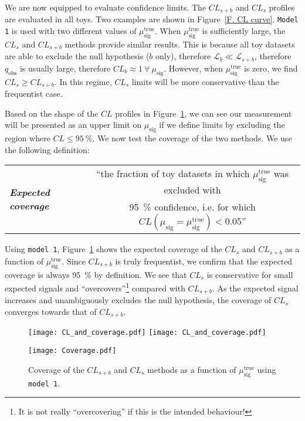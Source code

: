 We are now equipped to evaluate confidence limits. The $CL_{s+b}$ and $CL_s$ profiles are evaluated in all toys. Two examples are shown in Figure~\ref{F. CL curve}. \texttt{Model 1} is used with two different values of $\mu_\text{sig}^\text{true}$. When $\mu_\text{sig}^\text{true}$ is sufficiently large, the $CL_s$ and $CL_{s+b}$ methods provide similar results. This is because all toy datasets are able to exclude the null hypothesis ($b$ only), therefore $\mathcal{L}_b \ll \mathcal{L}_{s+b}$, therefore $q_\text{obs}$ is usually large, therefore $CL_b\approx1~\forall~\mu_\text{sig}$. However, when $\mu_\text{sig}^\text{true}$ is zero, we find $CL_s \geq CL_{s+b}$. In this regime, $CL_s$ limits will be more conservative than the frequentist case.

Based on the shape of the $CL$ profiles in Figure~\ref{F. Coverage}, we can see our measurement will be presented as an upper limit on $\mu_\text{sig}$ if we define limits by excluding the region where $CL\leq95~\%$. We now test the coverage of the two methods. We use the following definition:

 \begin{table}[h!]
 \begin{tabular}{lc}
\multirow{2}{*}{\textbf{\emph{Expected coverage}}} \hspace{0.5cm}  & ``the fraction of toy datasets in which $\mu_\text{sig}^\text{true}$ was excluded with \\
& 95~\% confidence, i.e. for which $CL\left(\mu_\text{sig}=\mu_\text{sig}^\text{true}\right)<0.05$''
\end{tabular}
\end{table}

Using \texttt{model 1}, Figure~\ref{F. Coverage} shows the expected coverage of the $CL_s$ and $CL_{s+b}$ as a function of $\mu_\text{sig}^\text{true}$. Since $CL_{s+b}$ is truly frequentist, we confirm that the expected coverage is always 95~\% by definition. We see that $CL_s$ is conservative for small expected signals and ``overcovers''\footnote{It is not really ``overcovering'' if this is the intended behaviour!} compared with $CL_{s+b}$. As the expected signal increases and unambiguously excludes the null hypothesis, the coverage of $CL_s$ converges towards that of $CL_{s+b}$.

\begin{figure}[!]
\centering
\texttt{[image: CL\_and\_coverage.pdf]}
\texttt{[image: CL\_and\_coverage.pdf]}
\caption{$CL_{s+b}$ and $CL_s$ curves evaluated using individual toys generated under two different $\mu_\text{sig}^\text{true}$ hypotheses using \texttt{model 1}. The toy with median $q_\text{obs}$ is shown.}
\label{F. CL curve}
\vspace{1cm}
\texttt{[image: Coverage.pdf]}
\caption{Coverage of the $CL_{s+b}$ and $CL_s$ methods as a function of $\mu_\text{sig}^\text{true}$ using \texttt{model 1}.}
\label{F. Coverage}
\end{figure}







